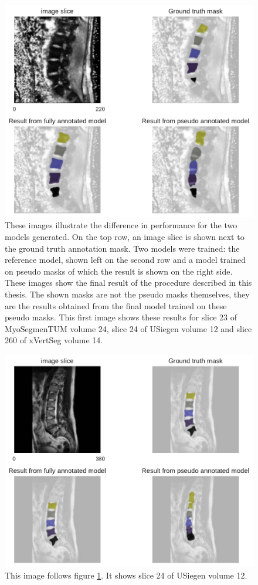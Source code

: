 \begin{figure}
    \centering
        \includegraphics[width=.90\textwidth]{images/fullvsPseudo_MyoSegmenTUM_024_023.pdf}
    \caption{These images illustrate the difference in performance for the two models generated. On the top row, an image slice is shown next to the ground truth annotation mask.
    Two models were trained: the reference model, shown left on the second row and a model trained on pseudo masks of which the result is shown on the right side. 
    These images show the final result of the procedure described in this thesis. The shown masks are not the pseudo masks themselves, they are the results obtained from the final model trained on these pseudo masks.
    This first image shows these results for slice 23 of MyoSegmenTUM volume 24, slice 24 of USiegen volume 12 and slice 260 of xVertSeg volume 14. 
    \protect
    \label{fig:fullvsPseudo}}
\end{figure}
\begin{figure}
    \centering
        \includegraphics[width=.90\textwidth]{images/fullvsPseudo_USiegen_012_024.pdf}
    \caption{This image follows figure \ref{fig:fullvsPseudo}. It shows slice 24 of USiegen volume 12. 
    \protect}
\end{figure}
